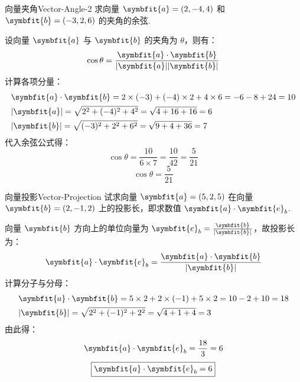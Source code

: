 \begin{problem}{向量夹角}{Vector-Angle-2}
    求向量 $\symbfit{a} = (2, -4, 4)$ 和 $\symbfit{b} = (-3, 2, 6)$ 的夹角的余弦.
\end{problem}

\begin{solution}
    设向量 $\symbfit{a}$ 与 $\symbfit{b}$ 的夹角为 $\theta$，则有：
    \begin{equation}
        \cos \theta = \frac{\symbfit{a} \cdot \symbfit{b}}{|\symbfit{a}| |\symbfit{b}|}
    \end{equation}
    计算各项分量：
    \begin{equation}
        \begin{aligned}
             & \symbfit{a} \cdot \symbfit{b} = 2 \times (-3) + (-4) \times 2 + 4 \times 6 = -6 - 8 + 24 = 10 \\
             & |\symbfit{a}| = \sqrt{2^2 + (-4)^2 + 4^2} = \sqrt{4 + 16 + 16} = 6                            \\
             & |\symbfit{b}| = \sqrt{(-3)^2 + 2^2 + 6^2} = \sqrt{9 + 4 + 36} = 7
        \end{aligned}
    \end{equation}
    代入余弦公式得：
    \begin{equation}
        \cos \theta = \frac{10}{6 \times 7} = \frac{10}{42} = \frac{5}{21}
    \end{equation}
    \begin{equation}
        \boxed{\cos \theta = \frac{5}{21}}
    \end{equation}
\end{solution}

\begin{problem}{向量投影}{Vector-Projection}
    试求向量 $\symbfit{a} = (5, 2, 5)$ 在向量 $\symbfit{b} = (2, -1, 2)$ 上的投影长，即求数值 $\symbfit{a} \cdot \symbfit{e}_b$.
\end{problem}

\begin{solution}
    向量 $\symbfit{b}$ 方向上的单位向量为 $\symbfit{e}_b = \frac{\symbfit{b}}{|\symbfit{b}|}$，故投影长为：
    \begin{equation}
        \symbfit{a} \cdot \symbfit{e}_b = \frac{\symbfit{a} \cdot \symbfit{b}}{|\symbfit{b}|}
    \end{equation}
    计算分子与分母：
    \begin{equation}
        \begin{aligned}
             & \symbfit{a} \cdot \symbfit{b} = 5 \times 2 + 2 \times (-1) + 5 \times 2 = 10 - 2 + 10 = 18 \\
             & |\symbfit{b}| = \sqrt{2^2 + (-1)^2 + 2^2} = \sqrt{4 + 1 + 4} = 3
        \end{aligned}
    \end{equation}
    由此得：
    \begin{equation}
        \symbfit{a} \cdot \symbfit{e}_b = \frac{18}{3} = 6
    \end{equation}
    \begin{equation}
        \boxed{\symbfit{a} \cdot \symbfit{e}_b = 6}
    \end{equation}
\end{solution}



